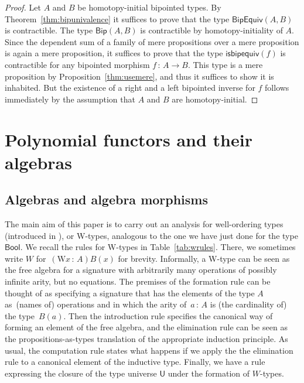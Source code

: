 \documentclass[10pt,a4paper,oneside,reqno]{amsart}
\numberwithin{equation}{section}
\theoremstyle{mythm}
\theoremstyle{mydef}
\theoremstyle{myrmk}
\newcommand{\co}{\,{:}\,}
\newcommand{\Bool}{\mathsf{Bool}}
\newcommand{\W}{\mathrm{W}}
\newcommand{\U}{\mathsf{U}}
\newcommand{\BipHom}{\mathsf{Bip}}
\newcommand{\isbipequiv}{\mathsf{isbipequiv}}
\newcommand{\BipEquiv}{\mathsf{BipEquiv}}
\begin{document}
\begin{proof} Let $A$ and $B$ be homotopy-initial bipointed types. 
By Theorem~\ref{thm:bipunivalence} it suffices to prove that the type $\BipEquiv(A,B)$ is contractible. The type 
$\BipHom( A, B)$ is contractible by homotopy-initiality of $A$. Since the dependent sum of a family of mere propositions over a mere proposition is again a mere proposition, it suffices to prove that the type $\isbipequiv(f)$ is contractible for any bipointed morphism $f \co A \to B$. This type is a mere proposition by 
Proposition~\ref{thm:usemere}, and thus it suffices to show it is inhabited. But the existence of a right and a left bipointed inverse for $f$ follows immediately
by the assumption that $A$ and $B$ are homotopy-initial.
\end{proof}



% 

\section{Polynomial functors and their algebras}
\label{section:wfiles}

\subsection*{Algebras and algebra morphisms}
The main aim of this paper is to carry out an analysis for well-ordering types (introduced in \cite{MartinLofP:intttp}), or W-types, analogous to the one we have just done for the type $\Bool$. We recall the rules for W-types in Table~\ref{tab:wrules}. There, we sometimes write $W$ for~$(\W x \co A) B(x)$ for
brevity.  Informally, a W-type can be seen as the free algebra for a signature
with arbitrarily many operations of possibly infinite arity, but no equations. The premises of the formation rule can be thought of as specifying a signature that has the elements of the type $A$ as~(names of) operations and in which the arity of~$a \co A$ is (the cardinality of) the type~$B(a)$. Then the introduction rule specifies the canonical way of forming an element of the free algebra, and the elimination rule can be seen as the propositions-as-types translation of the appropriate induction principle. As usual, the computation rule states what happens if we apply the
the elimination rule to a canonical element of the inductive type. Finally, we have a rule expressing the
closure of the type universe $\U$ under the formation of $W$-types.
\end{document}
